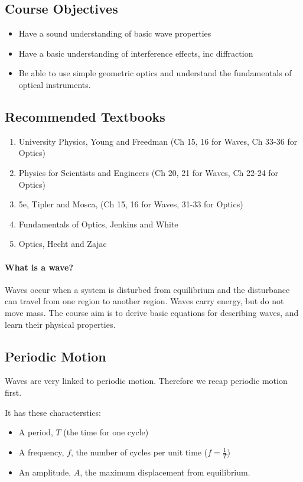 
\subsection*{Course Objectives}
\begin{itemize}
    \item Have a sound understanding of basic wave properties
    \item Have a basic understanding of interference effects, inc diffraction
    \item Be able to use simple geometric optics and understand the fundamentals of optical instruments.
\end{itemize}


\subsection*{Recommended Textbooks}
\begin{enumerate}
    \item University Physics, Young and Freedman (Ch 15, 16 for Waves, Ch 33-36 for Optics)
    \item Physics for Scientists and Engineers (Ch 20, 21 for Waves, Ch 22-24 for Optics)
    \item 5e, Tipler and Mosca, (Ch 15, 16 for Waves, 31-33 for Optics)
    \item Fundamentals of Optics, Jenkins and White
    \item Optics, Hecht and Zajac
\end{enumerate}

\paragraph{What is a wave?} Waves occur when a system is disturbed from equilibrium and the disturbance can travel from one region to another region. Waves carry energy, but do not move mass. The course aim is to derive basic equations for describing waves, and learn their physical properties.

\subsection*{Periodic Motion}
Waves are very linked to periodic motion. Therefore we recap periodic motion first.

It has these characterstics:
\begin{itemize}
    \item A period, $T$ (the time for one cycle)
    \item A frequency, $f$, the number of cycles per unit time ($f = \frac{1}{T}$)
    \item An amplitude, $A$, the maximum displacement from equilibrium.
\end{itemize}

